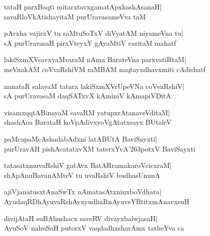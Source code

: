 \documentclass[twoside,12pt,openright]{book}
\def\S{\char'263}
\newcounter{shloka}[chapter]
\begin{document}
\begin{shloka}%
tataH parxBaqti mitarxtavxgamatApxkashAsanaH|\\
savaRloVkAtishayitaM purUravasameVva taM
\end{shloka}

\begin{shloka}%
pArxha vajirxV tu saMtuSoTxV diVyatAM niyameVna tu|\\
sA purUravasaH pirxVteyxY gAyaMtiV caritaM mahatf
\end{shloka}

\begin{shloka}%
lakiSxmXVsavxyaMvaraM nAma BarateVna parxvatiRtaM|\\
meVnakAM coVvaRshiVM raMBAM naqtayxdhavxmiti cAdishatf
\end{shloka}

\begin{shloka}%
nanataR salayaM tatarx lakiSxmXVrUpeVNa coVvaRshiV|\\
sA purUravasaM daqSATxvX kAminiV kAmapiVDitA
\end{shloka}

\begin{shloka}%
visamxqqtABinayaM savaRM yatupxrAtanaveVditaM|\\
shashAoa BarataH koVpAdivxyoVgAtatxsayx BUtaleV
\end{shloka}

\begin{shloka}%
paMcapaMcAshadabAdxni latABUtA BaviSayxti|\\
purUravAH pishAcatatxvXM taterxYvA\S potxV BaviSayxti
\end{shloka}

\begin{shloka}%
tatasatxmuvaRshiV gatAvx BatARramakaroVcicxraM|\\
shApAnuBavanAMteV tu uvaRshiV budhasUnunA
\end{shloka}

\begin{shloka}%
ajiVjanatusxtAnaSwTx nAmatasAtxninxboVdhata|\\
AyudaqRDhAyuvaRshAyxyudhaRnAyuveYRtitxmAnavxsuH
\end{shloka}

\begin{shloka}%
divijAtaH suBAhushacx saveRV divayxbalwjasaH|\\
AyuSoV nahuSaH putorxV vaqdadhxsharAmx tatheYva ca
\end{shloka}
\end{document}
